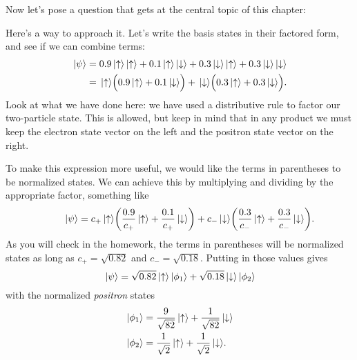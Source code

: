 Now let's pose a question that gets at the central topic of this
chapter: 


Here's a way to approach it.  Let's write the basis states in their
factored form, and see if we can combine terms:
\begin{align}
\,|\mbox{$\psi$}\rangle &= 
0.9 \,|\mbox{$\uparrow$}\rangle \,|\mbox{$\uparrow$}\rangle  + 0.1 \,|\mbox{$\uparrow$}\rangle \,|\mbox{$\downarrow$}\rangle + 
0.3 \,|\mbox{$\downarrow$}\rangle \,|\mbox{$\uparrow$}\rangle + 0.3 \,|\mbox{$\downarrow$}\rangle \,|\mbox{$\downarrow$}\rangle
  \nonumber\\
 &= \,|\mbox{$\uparrow$}\rangle\Bigl( 0.9\,|\mbox{$\uparrow$}\rangle + 0.1\,|\mbox{$\downarrow$}\rangle \Bigr)
 + \,|\mbox{$\downarrow$}\rangle\Bigl( 0.3\,|\mbox{$\uparrow$}\rangle + 0.3\,|\mbox{$\downarrow$}\rangle \Bigr) .
\end{align}
Look at what we have done here: we have used a distributive rule to
factor our two-particle state.  This is allowed, but keep in mind that
in any product we must keep the electron state vector on the left and
the positron state vector on the right.

To make this expression more useful, we would
like the terms in parentheses to be normalized states.  We can achieve this
by multiplying and dividing by the appropriate factor, something like
\begin{equation}
\qquad \,|\mbox{$\psi$}\rangle = c_+\,|\mbox{$\uparrow$}\rangle \biggl(\frac{0.9}{c_+}\,|\mbox{$\uparrow$}\rangle
   + \frac{0.1}{c_+}\,|\mbox{$\downarrow$}\rangle\biggr)
  + c_-\,|\mbox{$\downarrow$}\rangle\biggl( \frac{0.3}{c_-}\,|\mbox{$\uparrow$}\rangle + 
  \frac{0.3}{c_-}\,|\mbox{$\downarrow$}\rangle \biggr) .
\label{eq:factored_state}
\end{equation}
As you will check in the homework, the terms in parentheses will be
normalized states as long as $c_+ = \sqrt{0.82}$ and
$c_-=\sqrt{0.18}$.  Putting in those values gives
\begin{equation}
\,|\mbox{$\psi$}\rangle = \sqrt{0.82} \,|\mbox{$\uparrow$}\rangle\,|\mbox{$\phi_1$}\rangle +
  \sqrt{0.18}\,|\mbox{$\downarrow$}\rangle\,|\mbox{$\phi_2$}\rangle
\label{eq:canonical_entangled}
\end{equation}
with the normalized \textit{positron} states
\begin{align}
\,|\mbox{$\phi_1$}\rangle &= \frac{9}{\sqrt{82}}\,|\mbox{$\uparrow$}\rangle + \frac{1}{\sqrt{82}}
\,|\mbox{$\downarrow$}\rangle \nonumber\\
\,|\mbox{$\phi_2$}\rangle &= \frac{1}{\sqrt{2}}\,|\mbox{$\uparrow$}\rangle + \frac{1}{\sqrt{2}}
\,|\mbox{$\downarrow$}\rangle .
\label{eq:positron_states}
\end{align}

